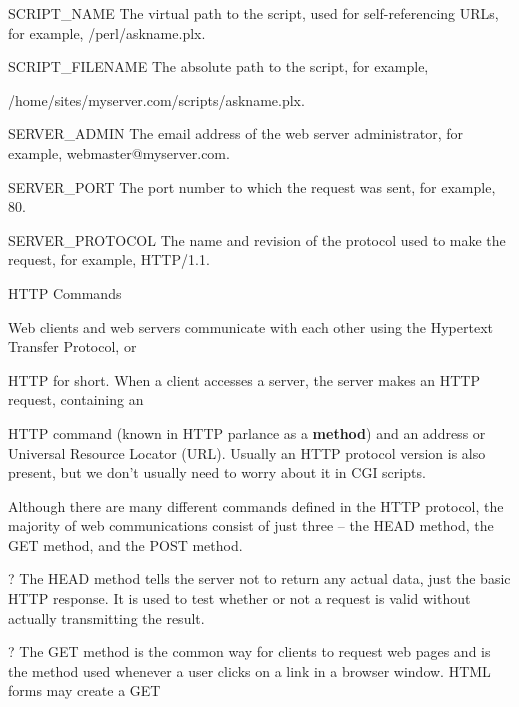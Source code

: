 \documentclass[a4paper,11pt]{book}
\begin{document}
\noindent 

\noindent SCRIPT\_NAME The virtual path to the script, used for self-referencing URLs, for example, /perl/askname.plx.

\noindent 

\noindent SCRIPT\_FILENAME The absolute path to the script, for example,

\noindent /home/sites/myserver.com/scripts/askname.plx.

\noindent 

\noindent SERVER\_ADMIN The email address of the web server administrator, for example, webmaster@myserver.com.

\noindent 

\noindent SERVER\_PORT The port number to which the request was sent, for example, 80.

\noindent 

\noindent SERVER\_PROTOCOL The name and revision of the protocol used to make the request, for example, HTTP/1.1.

\noindent 

\noindent 

\noindent HTTP Commands

\noindent 

\noindent Web clients and web servers communicate with each other using the Hypertext Transfer Protocol, or

\noindent HTTP for short. When a client accesses a server, the server makes an HTTP request, containing an

\noindent HTTP command (known in HTTP parlance as a \textbf{method}) and an address or Universal Resource Locator (URL). Usually an HTTP protocol version is also present, but we don't usually need to worry about it in CGI scripts.

\noindent 

\noindent Although there are many different commands defined in the HTTP protocol, the majority of web communications consist of just three -- the HEAD method, the GET method, and the POST method.

\noindent 

\noindent ? The HEAD method tells the server not to return any actual data, just the basic HTTP response. It is used to test whether or not a request is valid without actually transmitting the result.

\noindent ? The GET method is the common way for clients to request web pages and is the method used whenever a user clicks on a link in a browser window. HTML forms may create a GET
\end{document}
